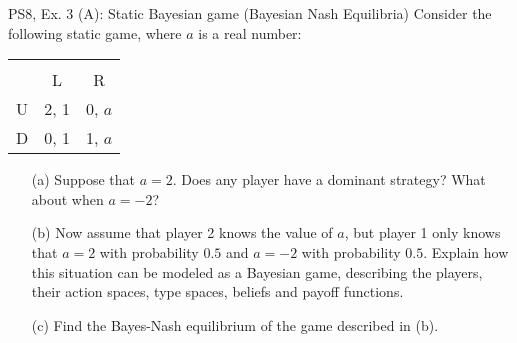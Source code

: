 \begin{frame}{PS8, Ex. 3 (A): Static Bayesian game (Bayesian Nash Equilibria)}
    Consider the following static game, where $a$ is a real number:
    \begin{table}
      \begin{tabular}{l|c|c|}
        \multicolumn{1}{c}{} & \multicolumn{2}{c}{} \\
        \multicolumn{1}{c}{} & \multicolumn{1}{c}{L} & \multicolumn{1}{c}{R} \\\cline{2-3}
        U & 2, 1 & 0, $a$ \\\cline{2-3}
        D & 0, 1 & 1, $a$ \\\cline{2-3}
      \end{tabular}
    \end{table}
    \begin{itemize}
        \item[(a)] Suppose that $a=2$. Does any player have a dominant strategy? What about when $a=-2$?
        \item[(b)] Now assume that player 2 knows the value of $a$, but player 1 only knows that $a=2$ with probability $0.5$ and $a=-2$ with probability $0.5$. Explain how this situation can be modeled as a Bayesian game, describing the players, their action spaces, type spaces, beliefs and payoff functions.
        \item[(c)] Find the Bayes-Nash equilibrium of the game described in (b).
    \end{itemize}
    \vfill\null
\end{frame}

